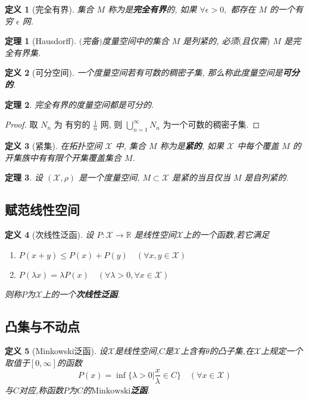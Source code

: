 \documentclass[12pt,a4paper]{article}
\newtheorem{thm}{定理}[subsection]  %
\newtheorem{definition}{定义}[subsection] %
\begin{document}
\begin{definition}[完全有界]
    集合 $M$ 称为是\textbf{完全有界}的, 如果 $\forall \epsilon > 0,$ 都存在 $M$ 的一个有穷 $\epsilon$ 网.
\end{definition}

\begin{thm}[Hausdorff]
    $($完备$)$度量空间中的集合 $M$ 是列紧的, 必须$($且仅需$)$ $M$ 是完全有界集.
\end{thm}

\begin{definition}[可分空间]
    一个度量空间若有可数的稠密子集, 那么称此度量空间是\textbf{可分的}.
\end{definition}

\begin{thm}
    完全有界的度量空间都是可分的.
\end{thm}
\begin{proof}
    取 $N_n$ 为 有穷的 $\frac{1}{n}$ 网, 则 $\bigcup\limits_{n=1}^{\infty} N_n$ 为一个可数的稠密子集.
\end{proof}

\begin{definition}[紧集]
    在拓扑空间 $\mathscr{X}$ 中, 集合 $M$ 称为是\textbf{紧的}, 如果 $\mathscr{X}$ 中每个覆盖 $M$ 的开集族中有有限个开集覆盖集合 $M$.
\end{definition}

\begin{thm}
    设 $(\mathscr{X}, \rho)$ 是一个度量空间, $M \subset \mathscr{X}$ 是紧的当且仅当 $M$ 是自列紧的.
\end{thm}

\subsection{赋范线性空间}
\begin{definition}[次线性泛函]
    设 $P:\mathscr{X} \to \mathbb{R}$ 是线性空间$\mathscr{X}$上的一个函数,若它满足
    \begin{enumerate}[label=(\roman*),font=\upshape]
        \item $P(x+y) \leq P(x) + P(y) \quad (\forall x, y \in \mathscr{X})$
        \item $P(\lambda x) = \lambda P(x) \quad (\forall \lambda > 0, \forall x \in \mathscr{X})$
    \end{enumerate}
    则称$P$为$\mathscr{X}$上的一个\textbf{次线性泛函}.
\end{definition}

\subsection{凸集与不动点}
\begin{definition}[Minkowski泛函]
    设$\mathscr{X}$是线性空间,$C$是$\mathscr{X}$上含有$\theta$的凸子集,在$\mathscr{X}$上规定一个取值于$[0,\infty]$的函数
    \[P(x) = \inf\{\lambda > 0 |\frac{x}{\lambda} \in C\} \quad (\forall x \in \mathscr{X})\]
    与$C$对应,称函数$P$为$C$的\textbf{$\mathrm{Minkowski}$泛函}.
\end{definition}
\end{document}
